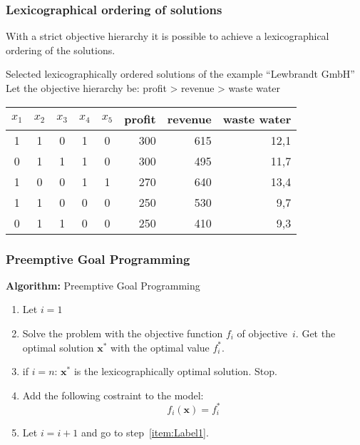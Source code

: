 \begin{frame}
 \frametitle{Lexicographical ordering of solutions}
 With a strict objective hierarchy it is possible to achieve a lexicographical ordering of the solutions.
 
 \begin{block}{Selected lexicographically ordered solutions of the example ``Lewbrandt GmbH''}
 Let the objective hierarchy be: profit > revenue > waste water\par
 \footnotesize
 \centering
 \begin{tabular}{*{5}{c}rrr}
  \toprule
  $x_1$ & $x_2$ & $x_3$ & $x_4$ & $x_5$ & \scriptsize profit & \scriptsize revenue & \scriptsize waste water\\
  \midrule
  1&	1&	0&	1&	0&	300&	615&	12,1\\
  0&	1&	1&	1&	0&	300&	495&	11,7\\
  1&	0&	0&	1&	1&	270&	640&	13,4\\
  1&	1&	0&	0&	0&	250&	530&	9,7\\
  0&	1&	1&	0&	0&	250&	410&	9,3\\
  \bottomrule
 \end{tabular}
 \end{block}
\end{frame}

\begin{frame}
 \frametitle{Preemptive Goal Programming}
 \textbf{Algorithm:} Preemptive Goal Programming
  \addtolength{\abovedisplayskip}{-2ex}
  \addtolength{\belowdisplayskip}{-2ex}
  \begin{enumerate}
  \item Let $i=1$
  \item \label{item:Label1} Solve the problem with the objective function $f_i$ of objective~$i$. Get the optimal solution $\mathbf{x}^*$ with the optimal value $f_i^*$.
  \item if $i=n$: $\mathbf{x}^*$ is the lexicographically optimal solution. Stop.
  \item Add the following costraint to the model: \[f_i(\mathbf{x}) = f_i^*\]
  \item Let $i=i+1$ and go to step~\ref{item:Label1}.
  \end{enumerate}
  \addtolength{\abovedisplayskip}{2ex}
  \addtolength{\belowdisplayskip}{2ex}
\end{frame}



